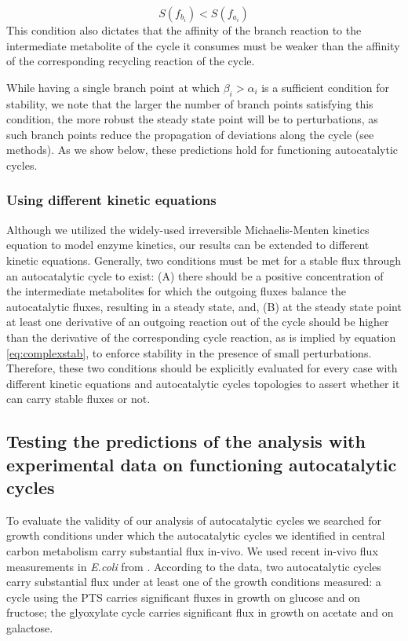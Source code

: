     \begin{equation}
        S(f_{b_i}) < S(f_{a_i})
      \label{eq:complexsat}
    \end{equation}
    This condition also dictates that the affinity of the branch reaction to the intermediate metabolite of the cycle it consumes must be weaker than the affinity of the corresponding recycling reaction of the cycle.

    While having a single branch point at which $\beta_i > \alpha_i$ is a sufficient condition for stability, we note that the larger the number of branch points satisfying this condition, the more robust the steady state point will be to perturbations, as such branch points reduce the propagation of deviations along the cycle (see methods).
    As we show below, these predictions hold for functioning autocatalytic cycles.
    \subsubsection{Using different kinetic equations}
    Although we utilized the widely-used irreversible Michaelis-Menten kinetics equation to model enzyme kinetics, our results can be extended to different kinetic equations.
    Generally, two conditions must be met for a stable flux through an autocatalytic cycle to exist: (A) there should be a positive concentration of the intermediate metabolites for which the outgoing fluxes balance the autocatalytic fluxes, resulting in a steady state, and, (B) at the steady state point at least one derivative of an outgoing reaction out of the cycle should be higher than the derivative of the corresponding cycle reaction, as is implied by equation \ref{eq:complexstab}, to enforce stability in the presence of small perturbations.
    Therefore, these two conditions should be explicitly evaluated for every case with different kinetic equations and autocatalytic cycles topologies to assert whether it can carry stable fluxes or not.


    \subsection{Testing the predictions of the analysis with experimental data on functioning autocatalytic cycles}
    To evaluate the validity of our analysis of autocatalytic cycles we searched for growth conditions under which the autocatalytic cycles we identified in central carbon metabolism carry substantial flux in-vivo.
    We used recent in-vivo flux measurements in \emph{E.coli} from \cite{Gerosa2015-oq}.
    According to the data, two autocatalytic cycles carry substantial flux under at least one of the growth conditions measured:
    a cycle using the PTS carries significant fluxes in growth on glucose and on fructose;
    the glyoxylate cycle carries significant flux in growth on acetate and on galactose.

